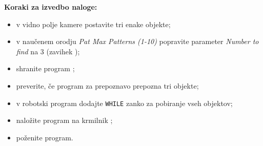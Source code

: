 
\vspace{5mm}

\begin{mdframed}[backgroundcolor=yellow!20, shadow=true,roundcorner=8pt]
	\textbf{Koraki za izvedbo naloge:}
	\begin{itemize}
		\item v vidno polje kamere postavite tri enake objekte;
		\item v naučenem orodju \emph{Pat Max Patterns (1-10)} popravite parameter \emph{Number to find} na 3 (zavihek );
		\item shranite program ;
		\item preverite, če program za prepoznavo prepozna tri objekte;
		\item v robotski program dodajte \verb"WHILE" zanko za pobiranje vseh objektov;
		\item naložite program na krmilnik ;
		\item poženite program.
	\end{itemize}
\end{mdframed}

